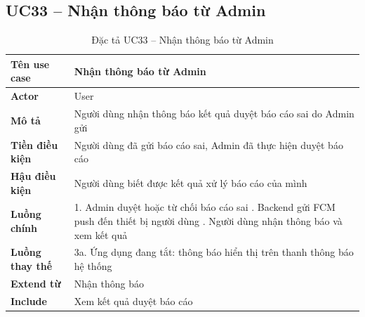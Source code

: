 \subsection*{UC33 -- Nhận thông báo từ Admin}
\begin{table}[H]
    \captionsetup{justification=raggedright, singlelinecheck=false}
    \caption{Đặc tả UC33 -- Nhận thông báo từ Admin}
\centering
\begin{tabular}{|p{3.5cm}|p{10cm}|}
\hline
\textbf{Tên use case} & Nhận thông báo từ Admin \\
\hline
\textbf{Actor} & User \\
\hline
\textbf{Mô tả} & Người dùng nhận thông báo kết quả duyệt
  báo cáo sai do Admin gửi \\
\hline
\textbf{Tiền điều kiện} & Người dùng đã gửi báo cáo sai,
  Admin đã thực hiện duyệt báo cáo \\
\hline
\textbf{Hậu điều kiện} & Người dùng biết được kết quả
  xử lý báo cáo của mình \\
\hline
\textbf{Luồng chính} &
  1. Admin duyệt hoặc từ chối báo cáo sai \newline
  2. Backend gửi FCM push đến thiết bị người dùng \newline
  3. Người dùng nhận thông báo và xem kết quả \\
\hline
\textbf{Luồng thay thế} &
  3a. Ứng dụng đang tắt: thông báo hiển thị
  trên thanh thông báo hệ thống \\
\hline
\textbf{Extend từ} & Nhận thông báo \\
\hline
\textbf{Include} & Xem kết quả duyệt báo cáo \\
\hline
\end{tabular}
\end{table}

